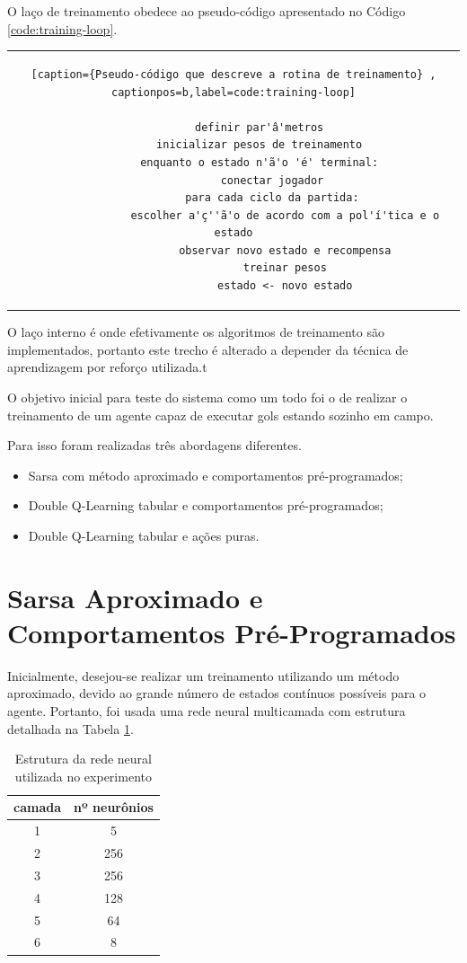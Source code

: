 O laço de treinamento obedece ao pseudo-código apresentado no Código \ref{code:training-loop}.

\begin{tabular}{c}
	\begin{lstlisting}[caption={Pseudo-código que descreve a rotina de treinamento} , captionpos=b,label=code:training-loop]
		
		definir par'â'metros
		inicializar pesos de treinamento
		enquanto o estado n'ã'o 'é' terminal:
			conectar jogador
			para cada ciclo da partida:
				escolher a'ç''ã'o de acordo com a pol'í'tica e o estado
				observar novo estado e recompensa
				treinar pesos
				estado <- novo estado
	\end{lstlisting}
\end{tabular}

O laço interno é onde efetivamente os algoritmos de treinamento são implementados, portanto este trecho é alterado a depender da técnica de aprendizagem por reforço utilizada.t

O objetivo inicial para teste do sistema como um todo foi o de realizar o treinamento de um agente capaz de executar gols estando sozinho em campo.

Para isso foram realizadas três abordagens diferentes.

\begin{itemize}
	\item Sarsa com método aproximado e comportamentos pré-programados;
	\item Double Q-Learning tabular e comportamentos pré-programados;
	\item Double Q-Learning tabular e ações puras.
\end{itemize}

\section{Sarsa Aproximado e Comportamentos Pré-Programados}
\label{subsec:sarsadev}
\par Inicialmente, desejou-se realizar um treinamento utilizando um método aproximado, devido ao grande número de estados contínuos possíveis para o agente. Portanto, foi usada uma rede neural multicamada com estrutura detalhada na Tabela \ref{table:ann}.

\begin{table}[h]
	\centering
	\begin{tabular}{||c c||} 
		\hline
		camada & nº neurônios  \\ [0.5ex] 
		\hline\hline
		1 & 5  \\ 
		\hline
		2 &  256 \\
		\hline
		3 & 256 \\
		\hline
		4 & 128  \\
		\hline
		5 & 64 \\ 
		\hline
		6 & 8 \\ [1ex] 
		\hline
	\end{tabular}
	\caption{Estrutura da rede neural utilizada no experimento}
	\label{table:ann}
\end{table}

